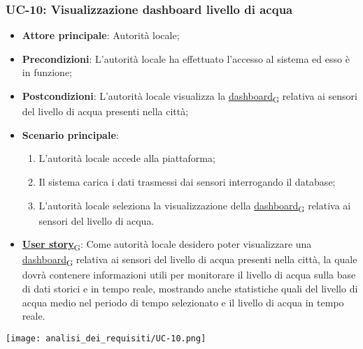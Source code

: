 \subsubsection{UC-10: Visualizzazione dashboard livello di acqua}
\begin{itemize}
	\item \textbf{Attore principale}: Autorità locale;
	\item \textbf{Precondizioni}: L'autorità locale ha effettuato l'accesso al sistema ed esso è in funzione;
	\item \textbf{Postcondizioni}: L'autorità locale visualizza la \href{https://7last.github.io/docs/rtb/documentazione-interna/glossario\#dashboard}{dashboard\textsubscript{G}} relativa
	      ai sensori del livello di acqua presenti nella città;
	\item \textbf{Scenario principale}:
	      \begin{enumerate}
		      \item L'autorità locale accede alla piattaforma;
		      \item Il sistema carica i dati trasmessi dai sensori interrogando il database;
		      \item L'autorità locale seleziona la visualizzazione della \href{https://7last.github.io/docs/rtb/documentazione-interna/glossario\#dashboard}{dashboard\textsubscript{G}} relativa ai sensori del livello di acqua.
	      \end{enumerate}
	\item \href{https://7last.github.io/docs/rtb/documentazione-interna/glossario\#user-story}{\textbf{User story}\textsubscript{G}}:
	      Come autorità locale desidero poter visualizzare una \href{https://7last.github.io/docs/rtb/documentazione-interna/glossario\#dashboard}{dashboard\textsubscript{G}} relativa ai sensori del livello di acqua presenti nella città, la quale
	      dovrà contenere informazioni utili per monitorare il livello di acqua sulla base di dati storici e in tempo reale, mostrando
	      anche statistiche quali del livello di acqua medio nel periodo di tempo selezionato e il livello di acqua in tempo reale.
\end{itemize}
\begin{center}
	\texttt{[image: analisi\_dei\_requisiti/UC-10.png]}
\end{center}

